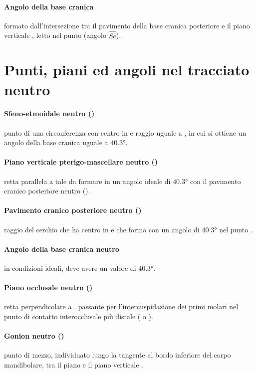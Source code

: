 \paragraph{Angolo della base cranica} formato dall'intersezione tra il pavimento della base cranica posteriore  e il piano verticale , letto nel punto  (angolo $\widehat{Se}$).
\section{Punti, piani ed angoli nel tracciato neutro}
\paragraph{Sfeno-etmoidale neutro ()} punto di una circonferenza con centro in  e raggio uguale a , in cui si ottiene un angolo della base cranica uguale a $40.3°$.
\paragraph{Piano verticale pterigo-mascellare neutro ()} retta parallela a  tale da formare in  un angolo ideale di $40.3°$ con il pavimento cranico posteriore neutro ().
\paragraph{Pavimento cranico posteriore neutro ()} raggio del cerchio che ha centro in  e che forma con  un angolo di $40.3°$ nel punto .
\paragraph{Angolo della base cranica neutro} in condizioni ideali, deve avere un valore di $40.3°$.
\paragraph{Piano occlusale neutro ()} retta perpendicolare a , passante per l'intercuspidazione dei primi molari nel punto di contatto interocclusale più distale ( o ).
\paragraph{Gonion neutro ()} punto di mezzo, individuato lungo la tangente al bordo inferiore del corpo mandibolare, tra il piano  e il piano verticale .
